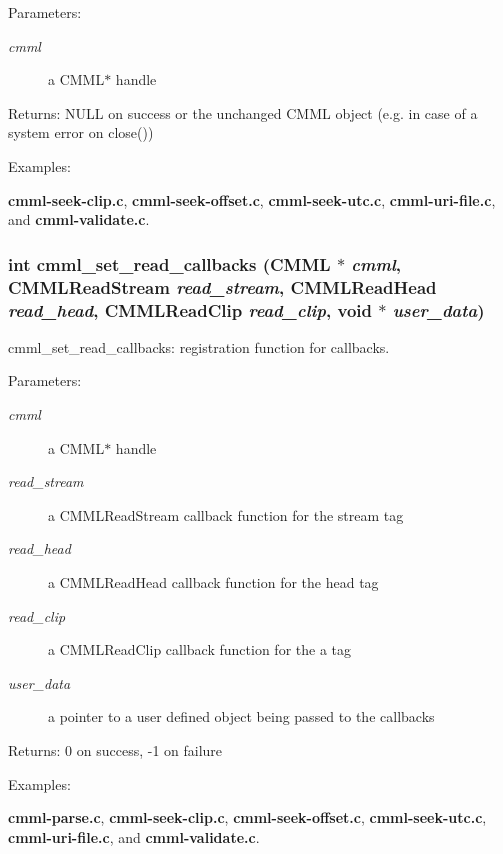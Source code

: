 \begin{Desc}
\item[Parameters:]
\begin{description}
\item[{\em cmml}]a CMML$\ast$ handle\end{description}
\end{Desc}
\begin{Desc}
\item[Returns:]NULL on success or the unchanged CMML object (e.g. in case of a system error on close()) \end{Desc}
\begin{Desc}
\item[Examples: ]\par
{\bf cmml-seek-clip.c}, {\bf cmml-seek-offset.c}, {\bf cmml-seek-utc.c}, {\bf cmml-uri-file.c}, and {\bf cmml-validate.c}.\end{Desc}
\subsubsection{\setlength{\rightskip}{0pt plus 5cm}int cmml\_\-set\_\-read\_\-callbacks ({\bf CMML} $\ast$ {\em cmml}, {\bf CMMLRead\-Stream} {\em read\_\-stream}, {\bf CMMLRead\-Head} {\em read\_\-head}, {\bf CMMLRead\-Clip} {\em read\_\-clip}, void $\ast$ {\em user\_\-data})}\label{cmml_8h_a41}


cmml\_\-set\_\-read\_\-callbacks: registration function for callbacks.

\begin{Desc}
\item[Parameters:]
\begin{description}
\item[{\em cmml}]a CMML$\ast$ handle \item[{\em read\_\-stream}]a CMMLRead\-Stream callback function for the stream tag \item[{\em read\_\-head}]a CMMLRead\-Head callback function for the head tag \item[{\em read\_\-clip}]a CMMLRead\-Clip callback function for the a tag \item[{\em user\_\-data}]a pointer to a user defined object being passed to the callbacks\end{description}
\end{Desc}
\begin{Desc}
\item[Returns:]0 on success, -1 on failure \end{Desc}
\begin{Desc}
\item[Examples: ]\par
{\bf cmml-parse.c}, {\bf cmml-seek-clip.c}, {\bf cmml-seek-offset.c}, {\bf cmml-seek-utc.c}, {\bf cmml-uri-file.c}, and {\bf cmml-validate.c}.\end{Desc}
